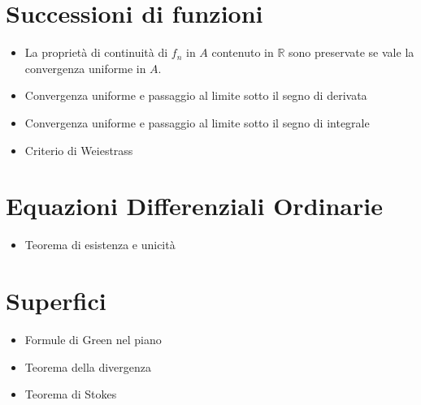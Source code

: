 \documentclass[a4paper]{book}
\numberwithin{equation}{section}
\theoremstyle{plain}
\theoremstyle{definition}
\theoremstyle{remark}
\theoremstyle{example}
\begin{document}
	\section{Successioni di funzioni}
	\begin{itemize}
		\item La proprietà di continuità di $f_n$ in $A$ contenuto in $\mathbb{R}$ sono preservate se vale la convergenza uniforme in $A$.
		\item Convergenza uniforme e passaggio al limite sotto il segno di derivata
		\item Convergenza uniforme e passaggio al limite sotto il segno di integrale
		\item Criterio di Weiestrass
	\end{itemize}

	\section{Equazioni Differenziali Ordinarie}
	\begin{itemize}
		\item Teorema di esistenza e unicità
	\end{itemize}

	\section{Superfici}
	\begin{itemize}
		\item Formule di Green nel piano
		\item Teorema della divergenza
		\item Teorema di Stokes
	\end{itemize}
	
\end{document}
